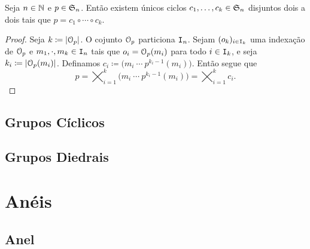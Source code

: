\begin{prop}
	Seja $n \in \mathbb{N}$ e $p \in \mathfrak{S}_n$. Então existem únicos ciclos $c_1,\ldots,c_k \in \mathfrak{S}_n$ disjuntos dois a dois tais que $p=c_1 \circ \cdots \circ c_k$.
\end{prop}
\begin{proof}
	Seja $k \coloneqq \card{\orb_p}$. O cojunto $\mathcal{O}_p$ particiona $\mathtt I_n$. Sejam $(o_k)_{i \in \mathtt I_k}$ uma indexação de $\mathcal{O}_p$ e $m_1,\cdot,m_k \in \mathtt I_n$ tais que $o_i=\mathcal{O}_p(m_i)$ para todo $i \in \mathtt I_k$, e seja $k_i \coloneqq \card{\orb_p(m_i)}$. Definamos $c_i \coloneqq  \bigl( m_i \ \cdots \  p^{k_i-1}(m_i)\bigr)$. Então segue que
	\begin{equation*}
	p = \bigtimes_{i=1}^k \bigl( m_i \ \cdots \  p^{k_i-1}(m_i)\bigr) = \bigtimes_{i=1}^k c_i.
	\end{equation*}
\end{proof}



\section{Grupos Cíclicos}

\section{Grupos Diedrais}



























\newpage

\chapter{Anéis}

\section{Anel}

